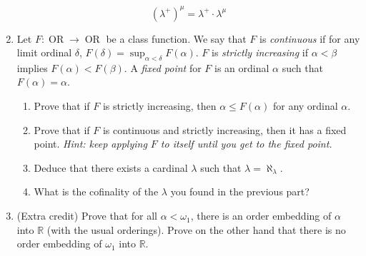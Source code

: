 \documentclass{amsart}
\theoremstyle{definition}
\newcommand{\Or}{\operatorname{OR}}
\newcommand{\Rr}{\mathbb{R}}
\begin{document}
\begin{enumerate}
  $$
  \left(\lambda^+\right)^\mu = \lambda^+ \cdot \lambda^\mu
  $$
\item Let $F: \Or \to \Or$ be a class function. We say that $F$ is \emph{continuous} if for any limit ordinal $\delta$, $F (\delta) = \sup_{\alpha < \delta} F (\alpha)$. $F$ is \emph{strictly increasing} if $\alpha < \beta$ implies $F (\alpha) < F (\beta)$. A \emph{fixed point} for $F$ is an ordinal $\alpha$ such that $F (\alpha) = \alpha$.

  \begin{enumerate}
  \item Prove that if $F$ is strictly increasing, then $\alpha \le F (\alpha)$ for any ordinal $\alpha$.
  \item Prove that if $F$ is continuous and strictly increasing, then it has a fixed point. \emph{Hint: keep applying $F$ to itself until you get to the fixed point.}
  \item Deduce that there exists a cardinal $\lambda$ such that $\lambda = \aleph_\lambda$.
  \item What is the cofinality of the $\lambda$ you found in the previous part?
  \end{enumerate}
\item (Extra credit) Prove that for all $\alpha < \omega_1$, there is an order embedding of $\alpha$ into $\Rr$ (with the usual orderings). Prove on the other hand that there is no order embedding of $\omega_1$ into $\Rr$.
\end{enumerate}
\end{document}
